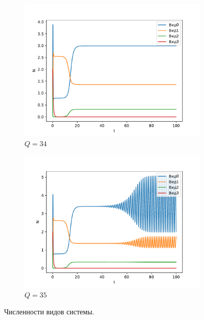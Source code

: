\begin{figure}[H]
    \centering
    \begin{subfigure}[t]{.3\linewidth}
        \centering
        \includegraphics[width=\textwidth]{pictures/exp_flow/exp2_Q34.pdf}
        \caption{\(Q = 34\)}
    \end{subfigure}
    \begin{subfigure}[t]{.3\linewidth}
        \centering
        \includegraphics[width=\textwidth]{pictures/exp_flow/exp2_Q35.pdf}
        \caption{\(Q = 35\)}
    \end{subfigure}
\caption{Численности видов системы.}  \label{fig:flow_exp2_q2}
\end{figure}

